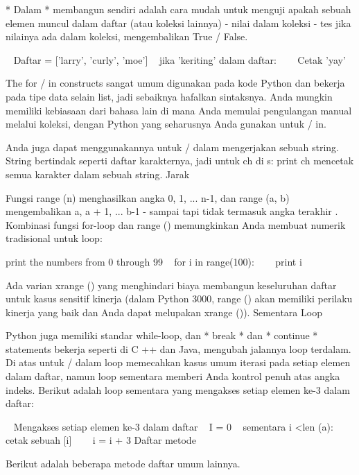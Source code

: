 * Dalam * membangun sendiri adalah cara mudah untuk menguji apakah sebuah elemen muncul dalam daftar (atau koleksi lainnya) - nilai dalam koleksi - tes jika nilainya ada dalam koleksi, mengembalikan True / False. 

~ Daftar = ['larry', 'curly', 'moe'] 
~ jika 'keriting' dalam daftar: 
~~~ Cetak 'yay' 

The for / in constructs sangat umum digunakan pada kode Python dan bekerja pada tipe data selain list, jadi sebaiknya hafalkan sintaksnya. Anda mungkin memiliki kebiasaan dari bahasa lain di mana Anda memulai pengulangan manual melalui koleksi, dengan Python yang seharusnya Anda gunakan untuk / in. 

Anda juga dapat menggunakannya untuk / dalam mengerjakan sebuah string. String bertindak seperti daftar karakternya, jadi untuk ch di s: print ch mencetak semua karakter dalam sebuah string. 
Jarak 

Fungsi range (n) menghasilkan angka 0, 1, ... n-1, dan range (a, b) mengembalikan a, a + 1, ... b-1 - sampai tapi tidak termasuk angka terakhir . Kombinasi fungsi for-loop dan range () memungkinkan Anda membuat numerik tradisional untuk loop: 


           print the numbers from 0 through 99 
~ for i in range(100): 
~~~ print i 

Ada varian xrange () yang menghindari biaya membangun keseluruhan daftar untuk kasus sensitif kinerja (dalam Python 3000, range () akan memiliki perilaku kinerja yang baik dan Anda dapat melupakan xrange ()). 
Sementara Loop 

Python juga memiliki standar while-loop, dan * break * dan * continue * statements bekerja seperti di C ++ dan Java, mengubah jalannya loop terdalam. Di atas untuk / dalam loop memecahkan kasus umum iterasi pada setiap elemen dalam daftar, namun loop sementara memberi Anda kontrol penuh atas angka indeks. Berikut adalah loop sementara yang mengakses setiap elemen ke-3 dalam daftar: 

~            Mengakses setiap elemen ke-3 dalam daftar 
~ I = 0 
~ sementara i <len (a): 
~~~ cetak sebuah [i] 
~~~ i = i + 3 
Daftar metode 

Berikut adalah beberapa metode daftar umum lainnya. 

